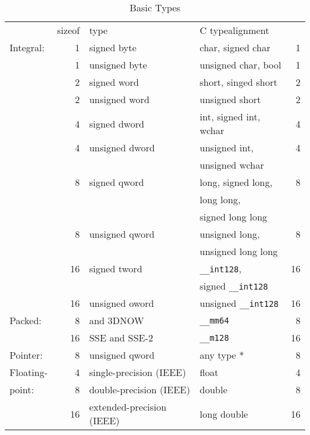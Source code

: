 \begin{table}
\caption{Basic Types}\label{tab-basic-types}
\begin{tabular}{lrllr}
\hline\noalign{\smallskip}
&sizeof & type			&\multicolumn{2}{l}{C type\hfill alignment} \\
\noalign{\smallskip}\hline\noalign{\smallskip}
Integral:
&1	& signed byte		&        char, signed char		& 1 \\
&1	& unsigned byte		&        unsigned char, bool		& 1 \\
&2	& signed word		&        short, singed short		& 2 \\
&2	& unsigned word		&        unsigned short			& 2 \\
&4	& signed dword		&        int, signed int, wchar		& 4 \\
&4	& unsigned dword	&        unsigned int,	& 4 \\
&       &                       &        unsigned wchar & \\
&8	& signed qword		&        long, signed long, 	& 8 \\
&        &                       &       long long, 		&  \\
&        &                       &       signed long long		&  \\
&8	& unsigned qword	&                unsigned long,		&	8 \\
&        &                       &          unsigned long long		& \\
&16	& signed tword		&        \verb|__int128|, & 16 \\
&	& 		        &        signed \verb|__int128|	&  \\
&16	& unsigned oword	&                unsigned \verb|__int128|	&	16 \\
\hline
Packed:
&8	& \MMX{} and 3DNOW		&	\verb|__mm64|				& 8 \\
&16	& SSE and SSE-2		&	\verb|__m128|				& 16 \\
\hline
Pointer:
&8	& unsigned qword	&		any type *		& 8 \\
\hline
Floating-
&4	& single-precision (IEEE) &	float				& 4 \\
point:&8	& double-precision (IEEE) &	double				& 8 \\
&16	& extended-precision (IEEE) & 	long double			& 16 \\
\hline
\end{tabular}
\end{table}

